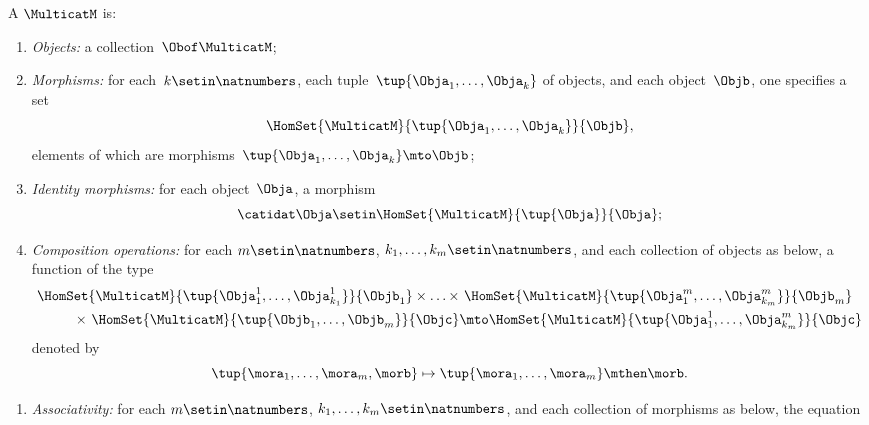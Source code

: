 \begin{ctdefinition}[Multicategory]
    \label{def:multicategory}
    A  $\MulticatM$ is:

    \constit
    \begin{enumerate}
        \item \emph{Objects:} a collection~$\Obof\MulticatM$;
        \item \emph{Morphisms:} for each~$k \setin \natnumbers$, each tuple~$\tup{\Obja_1,\ldots, \Obja_k}$ of objects, and each object~$ \Objb$, one specifies a set~
              \begin{equation}
                  \HomSet{\MulticatM}{\tup{\Obja_1,\ldots,\Obja_k}}{\Objb},
              \end{equation}
              elements of which are morphisms~$\tup{\Obja_1,\ldots,\Obja_k}\mto \Objb$;
        \item \emph{Identity morphisms:} for each object~$\Obja$, a morphism
              \begin{equation}
                  \catidat\Obja \setin \HomSet{\MulticatM}{\tup{\Obja}}{\Obja};
              \end{equation}
        \item \emph{Composition operations:} for each $m \setin \natnumbers$, $k_1, \dots, k_m \setin \natnumbers$, and each collection of objects as below, a function of the type
              \begin{equation}
                  \begin{aligned}
                      \HomSet{\MulticatM}{ \tup{\Obja_{1}^1, \ldots, \Obja_{k_1}^1} }{\Objb_1} \times \ldots \times & \ \HomSet{\MulticatM}{ \tup{\Obja_{1}^m, \ldots, \Obja_{k_m}^m} }{\Objb_m} \\
                      \qquad \times \ \HomSet{\MulticatM}{ \tup{\Objb_{1}, \ldots,\Objb_{m}} }{\Objc}               & \mto \HomSet{\MulticatM}{\tup{\Obja_{1}^1, \ldots, \Obja_{k_m}^m}}{\Objc}
                  \end{aligned}
              \end{equation}
              denoted by
              \begin{equation}
                  \tup{\mora_1,\ldots,\mora_m,\morb} \mapsto \tup{\mora_1,\ldots, \mora_m}\mthen \morb.
              \end{equation}
    \end{enumerate}
    \condit
    \begin{enumerate}
        \item \emph{Associativity:} for each $m \setin \natnumbers$, $k_1, \dots, k_m \setin \natnumbers$, and each collection of morphisms as below, the equation

\end{enumerate}
\end{ctdefinition}
